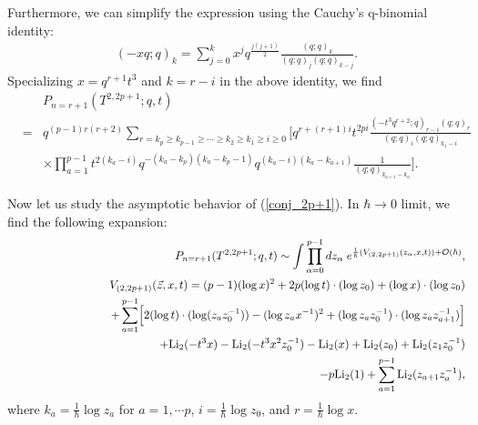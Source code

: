 \documentclass[hyper,letterpaper]{JHEP3}
\begin{document}
Furthermore, we can simplify the expression using the Cauchy's
q-binomial identity:
\begin{eqnarray}
(-xq;q)_k=\sum_{j=0}^kx^jq^{\frac{j(j+1)}{2}}\frac{(q;q)_k}{(q;q)_j(q;q)_{k-j}}.
\end{eqnarray}
Specializing $x=q^{r+1}t^3$ and $k=r-i$ in the above identity, we find
\begin{eqnarray}
&&P_{n=r+1}(T^{2,2p+1};q,t)
\nonumber \\
&=&q^{(p-1)r(r+2)}\sum_{r=k_p\ge k_{p-1}\ge\cdots\ge k_2\ge
 k_1\ge i\ge 0}
\Biggl[
q^{r+(r+1)i}t^{2pi}\frac{(-t^3q^{r+2};q)_{r-i}(q;q)_r}{(q;q)_i(q;q)_{k_1-i}}
\nonumber \\
&&
\times \prod_{a=1}^{p-1}t^{2(k_a-i)}q^{-(k_a-k_p)(k_a-k_p-1)}q^{(k_a-i)(k_a-k_{a+1})}\frac{1}{(q;q)_{k_{a+1}-k_{a}}}\Biggr].
\label{conj_2p+1}
\end{eqnarray}

Now let us study the asymptotic behavior of (\ref{conj_2p+1}).
In $\hbar\to 0$ limit, we find the following expansion:
\begin{eqnarray}
&& P_{n=r+1}(T^{2,2p+1};q,t)\sim \int \prod_{\alpha=0}^{p-1}dz_{\alpha}\;
e^{\frac{1}{\hbar}(V_{(2,2p+1)}(z_{\alpha},x,t))+{\cal O}(\hbar)}, \\
&& V_{(2,2p+1)}(\vec{z},x,t)=
(p-1)(\log x)^2+2p(\log t)\cdot(\log z_0)
+(\log x)\cdot(\log z_0)
\nonumber \\
&&\quad\quad\quad\quad\quad\quad\quad\quad
+\sum_{a=1}^{p-1}\Bigl[
2(\log t)\cdot (\log (z_az_0^{-1}))
-(\log z_ax^{-1})^2+(\log z_az_0^{-1})\cdot(\log z_az_{a+1}^{-1})
\Bigr]
\nonumber \\
&&\quad\quad\quad\quad\quad\quad\quad\quad
+{\rm Li}_2(-t^3x)-{\rm Li}_2(-t^3x^2z_0^{-1})-{\rm Li}_2(x)
+{\rm Li}_2(z_0)+{\rm Li}_2(z_1z_0^{-1})
\nonumber \\
&&\quad\quad\quad\quad\quad\quad\quad\quad
-p{\rm Li}_2(1)+\sum_{a=1}^{p-1}{\rm Li}_2(z_{a+1}z_{a}^{-1}),
\end{eqnarray}
where $k_a=\frac{1}{\hbar}\log z_a$ for $a=1,\cdots p$,
$i=\frac{1}{\hbar}\log z_0$, and $r=\frac{1}{\hbar}\log x$.
\end{document}
